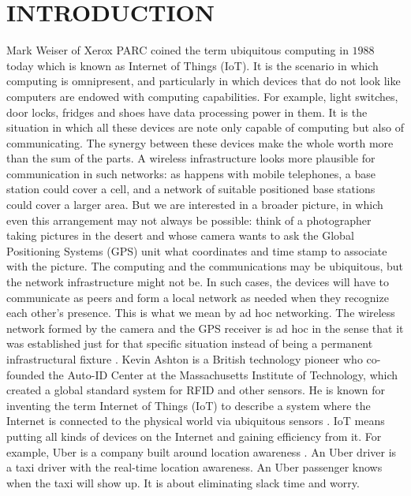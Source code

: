 \chapter{INTRODUCTION} %
\label{cha:introduction}
	
	Mark Weiser of Xerox PARC \cite{weiser1991computer} coined the term ubiquitous computing in $1988$ today which is known as Internet of Things (IoT). 
	It is the scenario in which computing is omnipresent, and particularly in which devices that do not look like computers are endowed with computing capabilities.
	For example, light switches, door locks, fridges and shoes have data processing power in them.
	It is the situation in which all these devices are note only capable of computing but also of communicating.
	The synergy between these devices make the whole worth more than the sum of the parts.
	A wireless infrastructure looks more plausible for communication in such networks: as happens with mobile telephones, a base station could cover a cell, and a network of suitable positioned base stations could cover a larger area.
	But we are interested in a broader picture, in which even this arrangement may not always be possible: think of a photographer taking pictures in the desert and whose camera wants to ask the Global Positioning Systems (GPS) unit what coordinates and time stamp to associate with the picture.
	The computing and the communications may be ubiquitous, but the network infrastructure might not be.
	In such cases, the devices will have to communicate as peers and form a local network as needed when they recognize each other's presence.
	This is what we mean by ad hoc networking.
	The wireless network formed by the camera and the GPS receiver is ad hoc in the sense that it was established just for that specific situation instead of being a permanent infrastructural fixture \cite{2002-Stajano-ubiquitous}.
	Kevin Ashton is a British technology pioneer who co-founded the Auto-ID Center at the Massachusetts Institute of Technology, which created a global standard system for RFID and other sensors.
	He is known for inventing the term Internet of Things (IoT) to describe a system where the Internet is connected to the physical world via ubiquitous sensors \cite{ashton2009internet}.
	IoT means putting all kinds of devices on the Internet and gaining efficiency from it. 
	For example, Uber is a company built around location awareness \cite{Uber}.
	An Uber driver is a taxi driver with the real-time location awareness.
	An Uber passenger knows when the taxi will show up.
	It is about eliminating slack time and worry.
